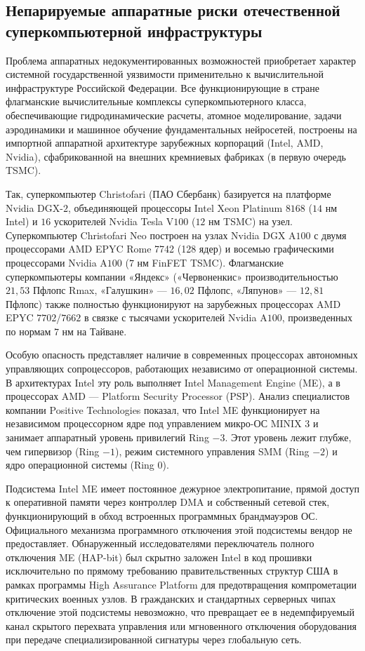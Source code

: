 \documentclass[12pt,a4paper]{article}
\begin{document}
\subsection{Непарируемые аппаратные риски отечественной суперкомпьютерной инфраструктуры}

Проблема аппаратных недокументированных возможностей приобретает 
характер системной государственной уязвимости применительно к 
вычислительной инфраструктуре Российской Федерации. Все функционирующие 
в стране флагманские вычислительные комплексы суперкомпьютерного класса, 
обеспечивающие гидродинамические расчеты, атомное моделирование, 
задачи аэродинамики и машинное обучение фундаментальных нейросетей, 
построены на импортной аппаратной архитектуре зарубежных корпораций 
(Intel, AMD, Nvidia), сфабрикованной на внешних кремниевых фабриках 
(в первую очередь TSMC).

Так, суперкомпьютер Christofari (ПАО Сбербанк) базируется на платформе 
Nvidia DGX-$2$, объединяющей процессоры Intel Xeon Platinum $8168$ 
($14$ нм Intel) и $16$ ускорителей Nvidia Tesla V$100$ ($12$ нм TSMC) на узел. 
Суперкомпьютер Christofari Neo построен на узлах Nvidia DGX A$100$ с 
двумя процессорами AMD EPYC Rome 7742 (128 ядер) и восемью графическими 
процессорами Nvidia A$100$ ($7$ нм FinFET TSMC). Флагманские суперкомпьютеры 
компании «Яндекс» («Червоненкис» производительностью $21{,}53$ Пфлопс Rmax, 
«Галушкин» — $16{,}02$ Пфлопс, «Ляпунов» — $12{,}81$ Пфлопс) также полностью 
функционируют на зарубежных процессорах AMD EPYC $7702$/$7662$ в связке с 
тысячами ускорителей Nvidia A$100$, произведенных по нормам $7$ нм на 
Тайване.

Особую опасность представляет наличие в современных процессорах 
автономных управляющих сопроцессоров, работающих независимо от 
операционной системы. В архитектурах Intel эту роль выполняет Intel 
Management Engine (ME), а в процессорах AMD --- Platform Security 
Processor (PSP). Анализ специалистов компании Positive Technologies 
показал, что Intel ME функционирует на независимом процессорном ядре 
под управлением микро-ОС MINIX $3$ и занимает аппаратный уровень 
привилегий Ring $-3$. Этот уровень лежит глубже, чем гипервизор (Ring $-1$), 
режим системного управления SMM (Ring $-2$) и ядро операционной системы 
(Ring $0$).

Подсистема Intel ME имеет постоянное дежурное электропитание, прямой 
доступ к оперативной памяти через контроллер DMA и собственный сетевой 
стек, функционирующий в обход встроенных программных брандмауэров ОС. 
Официального механизма программного отключения этой подсистемы вендор 
не предоставляет. Обнаруженный исследователями переключатель полного 
отключения ME (HAP-bit) был скрытно заложен Intel в код прошивки 
исключительно по прямому требованию правительственных структур США в 
рамках программы High Assurance Platform для предотвращения 
компрометации критических военных узлов. В гражданских и стандартных 
серверных чипах отключение этой подсистемы невозможно, что превращает 
ее в недемпфируемый канал скрытого перехвата управления или мгновенного 
отключения оборудования при передаче специализированной сигнатуры через 
глобальную сеть.
\end{document}
